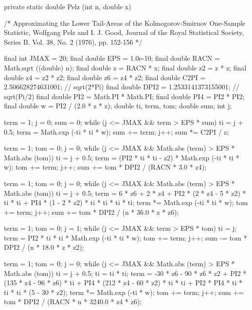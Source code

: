 \begin{code}\begin{hide}

   private static double Pelz (int n, double x) {
   /* Approximating the Lower Tail-Areas of the Kolmogorov-Smirnov One-Sample
         Statistic,
         Wolfgang Pelz and I. J. Good,
         Journal of the Royal Statistical Society, Series B.
             Vol. 38, No. 2 (1976), pp. 152-156
    */

      final int JMAX = 20;
      final double EPS = 1.0e-10;
      final double RACN = Math.sqrt ((double) n);
      final double z = RACN * x;
      final double z2 = z * z;
      final double z4 = z2 * z2;
      final double z6 = z4 * z2;
      final double C2PI = 2.506628274631001;   // sqrt(2*Pi)
      final double DPI2 = 1.2533141373155001;  // sqrt(Pi/2)
      final double PI2 = Math.PI * Math.PI;
      final double PI4 = PI2 * PI2;
      final double w = PI2 / (2.0 * z * z);
      double ti, term, tom;
      double sum;
      int j;

      term = 1;
      j = 0;
      sum = 0;
      while (j <= JMAX && term > EPS * sum) {
         ti = j + 0.5;
         term = Math.exp (-ti * ti * w);
         sum += term;
         j++;
      }
      sum *= C2PI / z;

      term = 1;
      tom = 0;
      j = 0;
      while (j <= JMAX && Math.abs (term) > EPS * Math.abs (tom)) {
         ti = j + 0.5;
         term = (PI2 * ti * ti - z2) * Math.exp (-ti * ti * w);
         tom += term;
         j++;
      }
      sum += tom * DPI2 / (RACN * 3.0 * z4);

      term = 1;
      tom = 0;
      j = 0;
      while (j <= JMAX && Math.abs (term) > EPS * Math.abs (tom)) {
         ti = j + 0.5;
         term = 6 * z6 + 2 * z4 + PI2 * (2 * z4 - 5 * z2) * ti * ti +
                PI4 * (1 - 2 * z2) * ti * ti * ti * ti;
         term *= Math.exp (-ti * ti * w);
         tom += term;
         j++;
      }
      sum += tom * DPI2 / (n * 36.0 * z * z6);

      term = 1;
      tom = 0;
      j = 1;
      while (j <= JMAX && term > EPS * tom) {
         ti = j;
         term = PI2 * ti * ti * Math.exp (-ti * ti * w);
         tom += term;
         j++;
      }
      sum -= tom * DPI2 / (n * 18.0 * z * z2);

      term = 1;
      tom = 0;
      j = 0;
      while (j <= JMAX && Math.abs (term) > EPS * Math.abs (tom)) {
         ti = j + 0.5;
         ti = ti * ti;
         term = -30 * z6 - 90 * z6 * z2 + PI2 * (135 * z4 - 96 * z6) * ti +
                PI4 * (212 * z4 - 60 * z2) * ti * ti +
                PI2 * PI4 * ti * ti * ti * (5 - 30 * z2);
         term *= Math.exp (-ti * w);
         tom += term;
         j++;
      }
      sum += tom * DPI2 / (RACN * n * 3240.0 * z4 * z6);

}
\end{hide}
\end{code}
